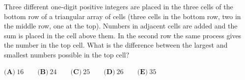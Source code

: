 Three different one-digit positive integers are placed in the three cells of the bottom row of a triangular array of cells (three cells in the bottom row, two in the middle row, one at the top). Numbers in adjacent cells are added and the sum is placed in the cell above them. In the second row the same process gives the number in the top cell. What is the difference between the largest and smallest numbers possible in the top cell?

$\textbf{(A)}\ 16\qquad\textbf{(B)}\ 24\qquad\textbf{(C)}\ 25\qquad\textbf{(D)}\ 26\qquad\textbf{(E)}\ 35$
